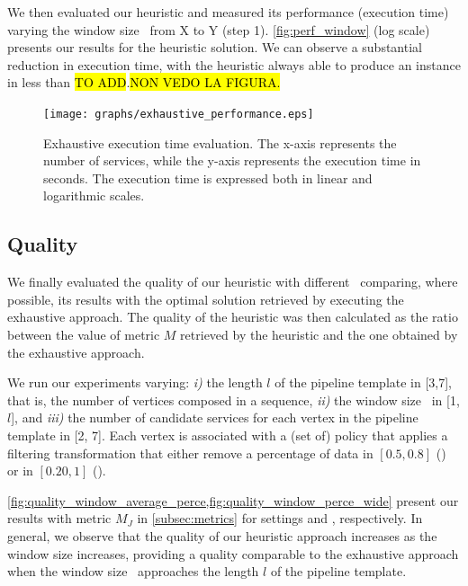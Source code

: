 We then evaluated our heuristic and measured its performance (execution time) varying the window size \windowsize\ from X to Y (step 1). \cref{fig:perf_window} (log scale) presents our results for the heuristic solution. We can observe a substantial reduction in execution time, with the heuristic always able to produce an instance in less than \hl{TO ADD}.\hl{NON VEDO LA FIGURA.}
\begin{figure}[htb!]
  \texttt{[image: graphs/exhaustive\_performance.eps]}
  \caption{Exhaustive execution time evaluation. The x-axis represents the number of services, while the y-axis represents the execution time in seconds. The execution time is expressed both in linear and logarithmic scales.}
  \label{fig:perf_exhaustive}
\end{figure}


\subsection{Quality}\label{subsec:experiments_quality}
We finally evaluated the quality of our heuristic with different \windowsize\ comparing, where possible, its results with the optimal solution retrieved by executing the exhaustive approach. %
The quality of the heuristic was then calculated as the ratio between the value of metric $M$ retrieved by the heuristic and the one obtained by the exhaustive approach.


We run our experiments varying: \emph{i)} the length $l$ of the pipeline template in [3,7], that is, the number of vertices composed in a sequence, \emph{ii)} the window size \windowsize\ in [1,$l$], and \emph{iii)} the number of candidate services for each vertex in the pipeline template in [2, 7]. Each vertex is associated with a (set of) policy that applies a filtering transformation that either remove a percentage of data in $[0.5,0.8]$ (\average) or in $[0.20,1]$ (\wide).



\cref{fig:quality_window_average_perce,fig:quality_window_perce_wide} present our results with metric $M_J$ in \cref{subsec:metrics} for settings \wide and \average, respectively.
In general, we observe that the quality of our heuristic approach increases as the window size increases, providing a quality comparable to the exhaustive approach when the window size \windowsize\ approaches the length $l$ of the pipeline template.

